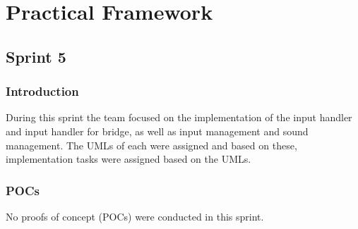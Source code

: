 
\section{Practical Framework}

\subsection{Sprint 5}

\subsubsection{Introduction}
During this sprint the team focused on the implementation of the input handler and input handler for bridge, as well as input management and sound management. The UMLs of each were assigned and based on these, implementation tasks were assigned based on the UMLs.

\subsubsection{POCs}

No proofs of concept (POCs) were conducted in this sprint.